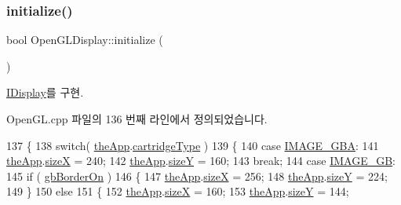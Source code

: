 \subsubsection{\texorpdfstring{initialize()}{initialize()}}
{\footnotesize\ttfamily bool Open\+G\+L\+Display\+::initialize (\begin{DoxyParamCaption}{ }\end{DoxyParamCaption})\hspace{0.3cm}{\ttfamily [virtual]}}



\mbox{\hyperlink{class_i_display_aa849b5d829138d08cf9efdbb00364a96}{I\+Display}}를 구현.



Open\+G\+L.\+cpp 파일의 136 번째 라인에서 정의되었습니다.


\begin{DoxyCode}
137 \{
138     \textcolor{keywordflow}{switch}( \mbox{\hyperlink{_v_b_a_8cpp_a8095a9d06b37a7efe3723f3218ad8fb3}{theApp}}.\mbox{\hyperlink{class_v_b_a_af300759fcbc7eeb00ce73f956fc5ddb7}{cartridgeType}} )
139     \{
140     \textcolor{keywordflow}{case} \mbox{\hyperlink{_util_8h_aef8b88d56fdf9a25f990a68d80c014d8a25f0ac1f3a37d568346fedece32e4bfb}{IMAGE\_GBA}}:
141         \mbox{\hyperlink{_v_b_a_8cpp_a8095a9d06b37a7efe3723f3218ad8fb3}{theApp}}.\mbox{\hyperlink{class_v_b_a_a7b711f29fd088fa6611d240277a24e9e}{sizeX}} = 240;
142         \mbox{\hyperlink{_v_b_a_8cpp_a8095a9d06b37a7efe3723f3218ad8fb3}{theApp}}.\mbox{\hyperlink{class_v_b_a_acb2e7221985fd0355f105cd1ec42e52e}{sizeY}} = 160;
143         \textcolor{keywordflow}{break};
144     \textcolor{keywordflow}{case} \mbox{\hyperlink{_util_8h_aef8b88d56fdf9a25f990a68d80c014d8a72281d361ec2edaf47e3a93b136dd4ed}{IMAGE\_GB}}:
145         \textcolor{keywordflow}{if} ( \mbox{\hyperlink{gb_globals_8cpp_a4700c36a68a6b63f7c2e91756a250cd2}{gbBorderOn}} )
146         \{
147             \mbox{\hyperlink{_v_b_a_8cpp_a8095a9d06b37a7efe3723f3218ad8fb3}{theApp}}.\mbox{\hyperlink{class_v_b_a_a7b711f29fd088fa6611d240277a24e9e}{sizeX}} = 256;
148             \mbox{\hyperlink{_v_b_a_8cpp_a8095a9d06b37a7efe3723f3218ad8fb3}{theApp}}.\mbox{\hyperlink{class_v_b_a_acb2e7221985fd0355f105cd1ec42e52e}{sizeY}} = 224;
149         \}
150         \textcolor{keywordflow}{else}
151         \{
152             \mbox{\hyperlink{_v_b_a_8cpp_a8095a9d06b37a7efe3723f3218ad8fb3}{theApp}}.\mbox{\hyperlink{class_v_b_a_a7b711f29fd088fa6611d240277a24e9e}{sizeX}} = 160;
153             \mbox{\hyperlink{_v_b_a_8cpp_a8095a9d06b37a7efe3723f3218ad8fb3}{theApp}}.\mbox{\hyperlink{class_v_b_a_acb2e7221985fd0355f105cd1ec42e52e}{sizeY}} = 144;

\end{DoxyCode}
